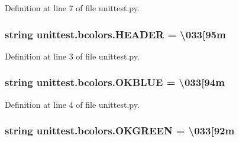 Definition at line 7 of file unittest.\+py.

\subsubsection[{\texorpdfstring{H\+E\+A\+D\+ER}{HEADER}}]{\setlength{\rightskip}{0pt plus 5cm}string unittest.\+bcolors.\+H\+E\+A\+D\+ER = \textquotesingle{}\textbackslash{}033\mbox{[}95m\textquotesingle{}\hspace{0.3cm}{\ttfamily [static]}}\hypertarget{classunittest_1_1bcolors_a0e8ae760e5f682550fc0b4e5638c47d0}{}\label{classunittest_1_1bcolors_a0e8ae760e5f682550fc0b4e5638c47d0}


Definition at line 3 of file unittest.\+py.

\subsubsection[{\texorpdfstring{O\+K\+B\+L\+UE}{OKBLUE}}]{\setlength{\rightskip}{0pt plus 5cm}string unittest.\+bcolors.\+O\+K\+B\+L\+UE = \textquotesingle{}\textbackslash{}033\mbox{[}94m\textquotesingle{}\hspace{0.3cm}{\ttfamily [static]}}\hypertarget{classunittest_1_1bcolors_ac76b755140eefd1ff1eda35552b9ea01}{}\label{classunittest_1_1bcolors_ac76b755140eefd1ff1eda35552b9ea01}


Definition at line 4 of file unittest.\+py.

\subsubsection[{\texorpdfstring{O\+K\+G\+R\+E\+EN}{OKGREEN}}]{\setlength{\rightskip}{0pt plus 5cm}string unittest.\+bcolors.\+O\+K\+G\+R\+E\+EN = \textquotesingle{}\textbackslash{}033\mbox{[}92m\textquotesingle{}\hspace{0.3cm}{\ttfamily [static]}}\hypertarget{classunittest_1_1bcolors_a4ea0a9b856e4906b0423ae6ae4ac16c8}{}\label{classunittest_1_1bcolors_a4ea0a9b856e4906b0423ae6ae4ac16c8}


